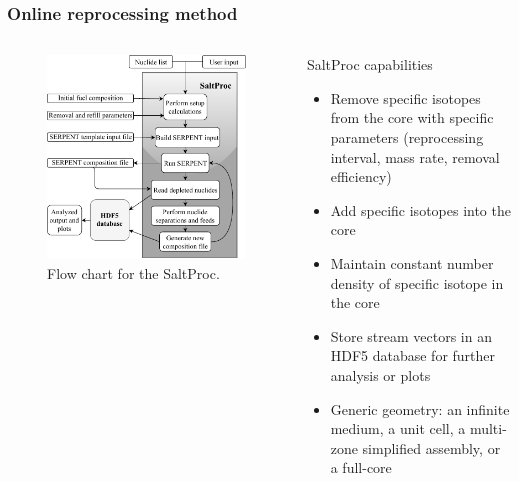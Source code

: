 \begin{frame}
\frametitle{Online reprocessing method}
  \begin{columns}
    \column[t]{6cm}
	\begin{figure}[t]
                \vspace*{-0.35in}
			\hspace{-0.3in}
                 \includegraphics[height=\textwidth]{./images/saltproc_flowchart.pdf}
                \vspace*{-0.05in}
                \caption{Flow chart for the SaltProc.}
      \end{figure}

    \column[t]{6cm}
             \begin{block}{SaltProc capabilities}
               \begin{itemize}             
               \item Remove specific isotopes from the core with specific parameters (reprocessing interval, mass rate, removal efficiency)
               \item Add specific isotopes into the core
               \item Maintain constant number density of specific isotope in the core
	       \item Store stream vectors in an HDF5 database for further analysis or plots
	       \item Generic geometry: an infinite medium, a unit cell, a multi-zone simplified assembly, or a full-core
               \end{itemize}
               \end{block}
  \end{columns}
\end{frame}

